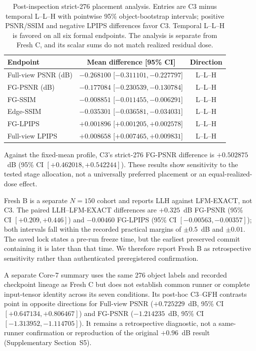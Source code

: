 \documentclass[times,twocolumn,final]{elsarticle}
\begin{document}
\begin{table}[t]
\centering
\scriptsize
\setlength{\tabcolsep}{4pt}
\caption{Post-inspection strict-276 placement analysis. Entries are C3 minus temporal L--L--H with pointwise 95\% object-bootstrap intervals; positive PSNR/SSIM and negative LPIPS differences favor C3. Temporal L--L--H is favored on all six formal endpoints. The analysis is separate from Fresh C, and its scalar sums do not match realized residual dose.}
\label{tab:temporal-placement}
\begin{tabular}{lcc}
\toprule
Endpoint & Mean difference [95\% CI] & Direction \\
\midrule
Full-view PSNR (dB) & $-0.268100$ [$-0.311101,-0.227797$] & L--L--H \\
FG-PSNR (dB) & $-0.177084$ [$-0.230539,-0.130784$] & L--L--H \\
FG-SSIM & $-0.008851$ [$-0.011455,-0.006291$] & L--L--H \\
Edge-SSIM & $-0.035301$ [$-0.036581,-0.034031$] & L--L--H \\
FG-LPIPS & $+0.001896$ [$+0.001205,+0.002578$] & L--L--H \\
Full-view LPIPS & $+0.008658$ [$+0.007465,+0.009831$] & L--L--H \\
\bottomrule
\end{tabular}
\end{table}

Against the fixed-mean profile, C3's strict-276 FG-PSNR difference is $+0.502875$~dB (95\% CI $[+0.462018,+0.542244]$). These results show sensitivity to the tested stage allocation, not a universally preferred placement or an equal-realized-dose effect.

Fresh B is a separate $N=150$ cohort and reports LLH against LFM-EXACT, not C3. The paired LLH--LFM-EXACT differences are $+0.325$~dB FG-PSNR (95\% CI $[+0.209,+0.446]$) and $-0.00460$ FG-LPIPS (95\% CI $[-0.00563,-0.00357]$); both intervals fall within the recorded practical margins of $\pm0.5$~dB and $\pm0.01$. The saved lock states a pre-run freeze time, but the earliest preserved commit containing it is later than that time. We therefore report Fresh B as retrospective sensitivity rather than authenticated preregistered confirmation.

A separate Core-7 summary uses the same 276 object labels and recorded checkpoint lineage as Fresh C but does not establish common runner or complete input-tensor identity across its seven conditions. Its post-hoc C3--GFH contrasts point in opposite directions for Full-view PSNR ($+0.725229$~dB, 95\% CI $[+0.647134,+0.806467]$) and FG-PSNR ($-1.214235$~dB, 95\% CI $[-1.313952,-1.114705]$). It remains a retrospective diagnostic, not a same-runner confirmation or reproduction of the original $+0.96$~dB result (Supplementary Section~S5).
\end{document}
